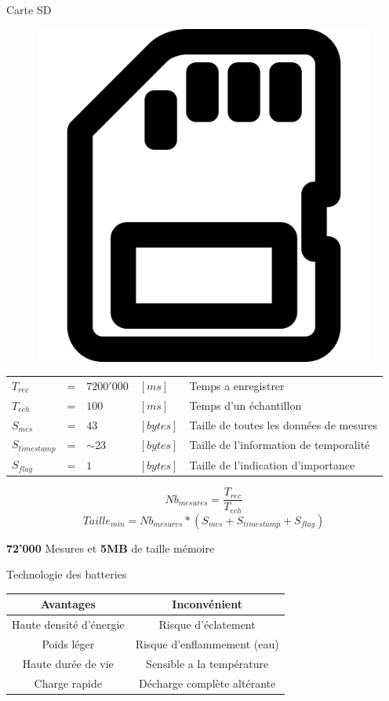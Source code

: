 \documentclass[compress,aspectratio=169]{beamer}
\begin{document}
\begin{frame}[containsverbatim]{Carte SD}
	\begin{figure}
		\centering
		\includegraphics[width=0.1\linewidth]{Images/SDcard}
	\end{figure}
	\begin{tabular}{l l ll|l}
		$ T_{rec} $ & = &  $7200'000$ & $[ms]$ & Temps a enregistrer \\
		$ T_{ech}$ & = & $100$  & $[ms]$ & Temps d'un échantillon \\
		$ S_{mes} $ & = & $43$ & $[bytes]$ & Taille de toutes les données de mesures  \\
		$ S_{timestamp} $ & = & $\sim$23 & $[bytes]$ & Taille de l'information de temporalité  \\
		$ S_{flag} $ & = & $ 1 $ & $[bytes]$ & Taille de l'indication d'importance 
	\end{tabular}
    \begin{equation} \label{equ:NbMes}
		Nb_{mesures} = \frac{T_{rec}}{T_{ech}}
	\end{equation} 
	\begin{equation} \label{equ:TailleMin}
		Taille_{min} = Nb_{mesures} * (S_{mes}+S_{timestamp}+S_{flag}) 
	\end{equation}
	
	\textbf{72'000} Mesures et \textbf{5MB} de taille mémoire
\end{frame}

\begin{frame}[containsverbatim]{Technologie des batteries}
	\par
	\begin{tabular}{c|c}
		Avantages &  Inconvénient\\
		\hline
		Haute densité d'énergie & Risque d'éclatement \\
		Poids léger & Risque d'enflammement (eau) \\ 
		Haute durée de vie & Sensible a la température \\
		Charge rapide & Décharge complète altérante \\
	\end{tabular}
	\par
\end{frame}
\end{document}
